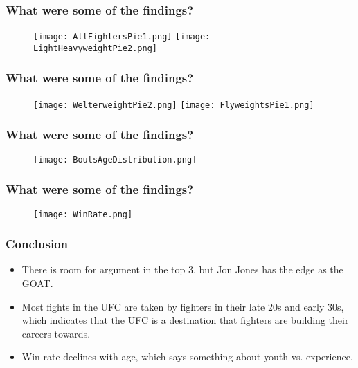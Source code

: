 \documentclass{beamer}
\begin{document}
\begin{frame}
\frametitle{What were some of the findings?}
\begin{figure}
   \texttt{[image: AllFightersPie1.png]}
   \hfill
   \texttt{[image: LightHeavyweightPie2.png]}
\end{figure}
\end{frame}

\begin{frame}
\frametitle{What were some of the findings?}
\begin{figure}
   \texttt{[image: WelterweightPie2.png]}
   \hfill
   \texttt{[image: FlyweightsPie1.png]}

\end{figure}
\end{frame}

\begin{frame}
\frametitle{What were some of the findings?}
\begin{center}
\begin{figure}
\texttt{[image: BoutsAgeDistribution.png]}
\end{figure}
\end{center}
\end{frame}

\begin{frame}
\frametitle{What were some of the findings?}
\begin{center}
\begin{figure}
\texttt{[image: WinRate.png]}
\end{figure}
\end{center}
\end{frame}

\begin{frame}
\frametitle{Conclusion}
\begin{itemize}
  \item There is room for argument in the top 3, but Jon Jones has the edge as the GOAT.
  \item Most fights in the UFC are taken by fighters in their late 20s and early 30s, which indicates that the UFC is a destination that fighters are building their careers towards.
  \item Win rate declines with age, which says something about youth vs. experience. 
\end{itemize}
\end{frame}
\end{document}

